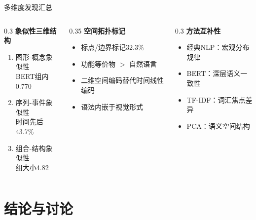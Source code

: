 \documentclass[aspectratio=169,xcolor=x11names,compress]{ctexbeamer}
\begin{document}
\begin{frame}{多维度发现汇总}
\footnotesize
\begin{columns}
\begin{column}{0.3\textwidth}
\textbf{象似性三维结构}
\begin{enumerate}
    \item 图形-概念象似性\\
    BERT组内0.770
    \item 序列-事件象似性\\
    时间先后43.7\%
    \item 组合-结构象似性\\
    组大小4.82
\end{enumerate}
\end{column}
\begin{column}{0.35\textwidth}
\textbf{空间拓扑标记}
\begin{itemize}
    \item 标点/边界标记32.3\%
    \item 功能等价物 $>$ 自然语言
    \item 二维空间编码替代时间线性编码
    \item 语法内嵌于视觉形式
\end{itemize}
\end{column}
\begin{column}{0.3\textwidth}
\textbf{方法互补性}
\begin{itemize}
    \item 经典NLP：宏观分布规律
    \item BERT：深层语义一致性
    \item TF-IDF：词汇焦点差异
    \item PCA：语义空间结构
\end{itemize}
\end{column}
\end{columns}
\end{frame}

\section{结论与讨论}
\end{document}
